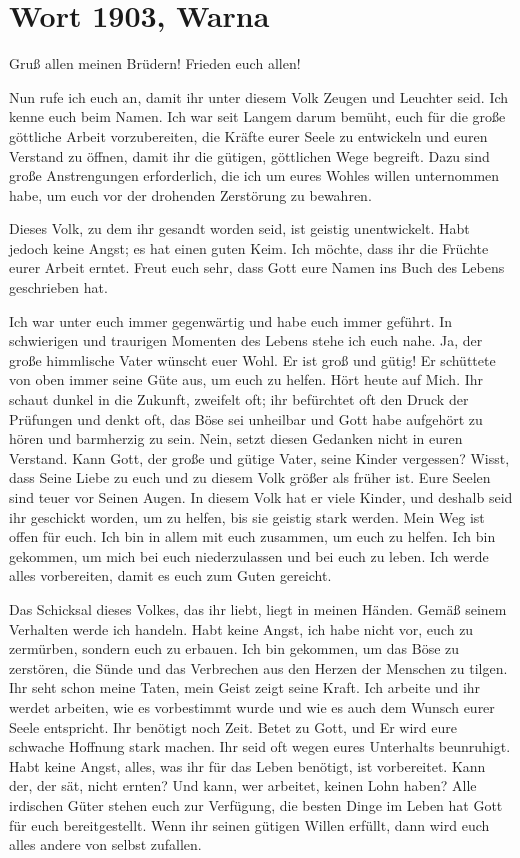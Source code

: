 \chapter{Wort 1903, Warna}
	

Gruß allen meinen Brüdern! Frieden euch allen!

Nun rufe ich euch an, damit ihr unter diesem Volk Zeugen und Leuchter seid. Ich kenne euch beim Namen. Ich war seit Langem darum bemüht, euch für die große göttliche Arbeit vorzubereiten, die Kräfte eurer Seele zu entwickeln und euren Verstand zu öffnen, damit ihr die gütigen, göttlichen Wege begreift. Dazu sind große Anstrengungen erforderlich, die ich um eures Wohles willen unternommen habe, um euch vor der drohenden Zerstörung zu bewahren.


Dieses Volk, zu dem ihr gesandt worden seid, ist geistig unentwickelt. Habt jedoch keine Angst; es hat einen guten Keim. Ich möchte, dass ihr die Früchte eurer Arbeit erntet. Freut euch sehr, dass Gott eure Namen ins Buch des Lebens geschrieben hat.

Ich war unter euch immer gegenwärtig und habe euch immer geführt. In schwierigen und traurigen Momenten des Lebens stehe ich euch nahe. Ja, der große himmlische Vater wünscht euer Wohl. Er ist groß und gütig! Er schüttete von oben immer seine Güte aus, um euch zu helfen. Hört heute auf Mich. Ihr schaut dunkel in die Zukunft, zweifelt oft; ihr befürchtet oft den Druck der Prüfungen und denkt oft, das Böse sei unheilbar und Gott habe aufgehört zu hören und barmherzig zu sein. Nein, setzt diesen Gedanken nicht in euren Verstand. Kann Gott, der große und gütige Vater, seine Kinder vergessen? Wisst, dass Seine Liebe zu euch und zu diesem Volk größer als früher ist. Eure Seelen sind teuer vor Seinen Augen. In diesem Volk hat er viele Kinder, und deshalb seid ihr geschickt worden, um zu helfen, bis sie geistig stark werden. Mein Weg ist offen für euch. Ich bin in allem mit euch zusammen, um euch zu helfen. Ich bin gekommen, um mich bei euch niederzulassen und bei euch zu leben. Ich werde alles vorbereiten, damit es euch zum Guten gereicht.

Das Schicksal dieses Volkes, das ihr liebt, liegt in meinen Händen. Gemäß seinem Verhalten werde ich handeln. Habt keine Angst, ich habe nicht vor, euch zu zermürben, sondern euch zu erbauen. Ich bin gekommen, um das Böse zu zerstören, die Sünde und das Verbrechen aus den Herzen der Menschen zu tilgen. Ihr seht schon meine Taten, mein Geist zeigt seine Kraft. Ich arbeite und ihr werdet arbeiten, wie es vorbestimmt wurde und wie es auch dem Wunsch eurer Seele entspricht. Ihr benötigt noch Zeit. Betet zu Gott, und Er wird eure schwache Hoffnung stark machen. Ihr seid oft wegen eures Unterhalts beunruhigt. Habt keine Angst, alles, was ihr für das Leben benötigt, ist vorbereitet. Kann der, der sät, nicht ernten? Und kann, wer arbeitet, keinen Lohn haben? Alle irdischen Güter stehen euch zur Verfügung, die besten Dinge im Leben hat Gott für euch bereitgestellt. Wenn ihr seinen gütigen Willen erfüllt, dann wird euch alles andere von selbst zufallen. 

